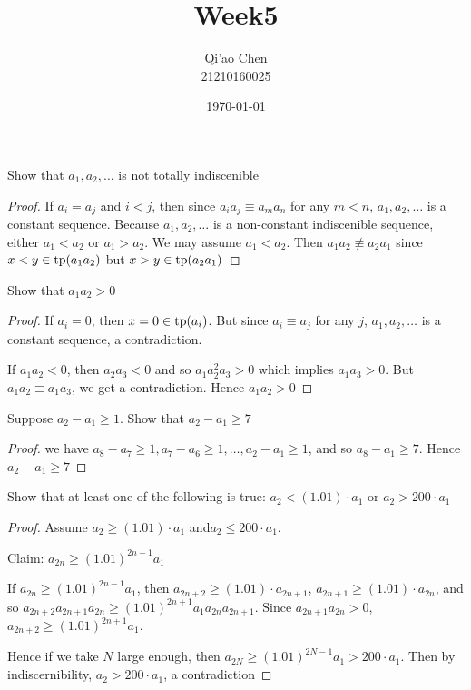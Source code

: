 \documentclass[11pt]{article}
\author{Qi'ao Chen\\21210160025}
\date{\today}
\title{Week5}
\begin{document}
\maketitle
\begin{exercise}
Show that \(a_1,a_2,\dots\) is not totally indiscenible
\end{exercise}

\begin{proof}
If \(a_i=a_j\) and \(i<j\), then since \(a_ia_j\equiv a_ma_n\) for any \(m<n\), \(a_1,a_2,\dots\) is a constant sequence.
Because \(a_1,a_2,\dots\) is  a non-constant
indiscenible sequence, either \(a_1<a_2\) or \(a_1>a_2\). We may assume \(a_1<a_2\).
Then \(a_1a_2\not\equiv a_2a_1\) since \(x<y\in\operatorname{tp}(a_1a_2)\) but \(x>y\in\operatorname{tp}(a_2a_1)\)
\end{proof}

\begin{exercise}
Show that \(a_1a_2>0\)
\end{exercise}

\begin{proof}
If \(a_i=0\), then \(x=0\in\operatorname{tp}(a_i)\). But since \(a_i\equiv a_j\) for any \(j\), \(a_1,a_2,\dots\) is a constant
sequence, a contradiction.

If \(a_1a_2<0\), then \(a_2a_3<0\) and so \(a_1a^2_2a_3>0\) which implies \(a_1a_3>0\). But \(a_1a_2\equiv a_1a_3\), we
get a contradiction. Hence \(a_1a_2>0\)
\end{proof}

\begin{exercise}
Suppose \(a_2-a_1\ge 1\). Show that \(a_2-a_1\ge 7\)
\end{exercise}

\begin{proof}
we have \(a_8-a_7\ge 1,a_7-a_6\ge 1,\dots,a_2-a_1\ge 1\), and so \(a_8-a_1\ge 7\). Hence \(a_2-a_1\ge 7\)
\end{proof}

\begin{exercise}
Show that at least one of the following is true: \(a_2<(1.01)\cdot a_1\) or \(a_2>200\cdot a_1\)
\end{exercise}

\begin{proof}
Assume \(a_2\ge (1.01)\cdot a_1\) and\(a_2\le 200\cdot a_1\).

Claim: \(a_{2n}\ge(1.01)^{2n-1}a_1\)

If \(a_{2n}\ge(1.01)^{2n-1}a_1\), then \(a_{2n+2}\ge(1.01)\cdot a_{2n+1}\), \(a_{2n+1}\ge(1.01)\cdot a_{2n}\), and
so \(a_{2n+2}a_{2n+1}a_{2n}\ge(1.01)^{2n+1}a_1a_{2n}a_{2n+1}\).
Since \(a_{2n+1}a_{2n}>0\), \(a_{2n+2}\ge(1.01)^{2n+1}a_1\).

Hence if we take \(N\) large enough, then \(a_{2N}\ge(1.01)^{2N-1}a_1>200\cdot a_1\). Then by
indiscernibility, \(a_2>200\cdot a_1\), a contradiction
\end{proof}
\end{document}

